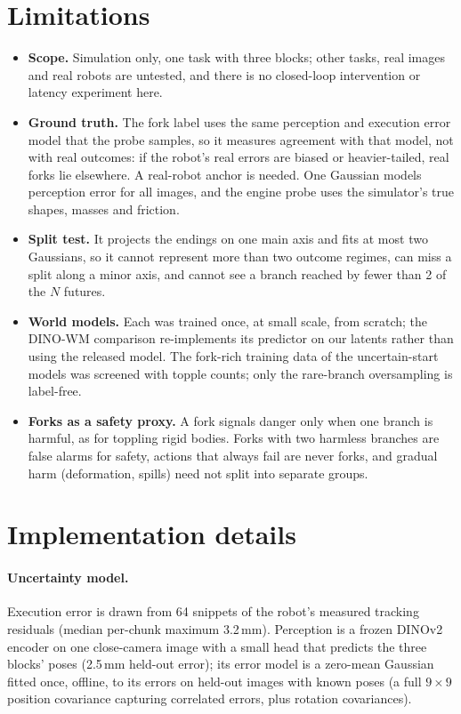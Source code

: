 \documentclass{article}
\begin{document}
\section{Limitations}\label{app:limitations}
\begin{itemize}\setlength{\itemsep}{1pt}\setlength{\parskip}{0pt}
\item \textbf{Scope.} Simulation only, one task with three blocks; other tasks, real images and real
robots are untested, and there is no closed-loop intervention or latency experiment here.
\item \textbf{Ground truth.} The fork label uses the same perception and execution error model that the
probe samples, so it measures agreement with that model, not with real outcomes: if the robot's real errors
are biased or heavier-tailed, real forks lie elsewhere. A real-robot anchor is needed. One Gaussian models perception error for all images, and the engine probe uses the simulator's
true shapes, masses and friction.
\item \textbf{Split test.} It projects the endings on one main axis and fits at most two Gaussians, so it
cannot represent more than two outcome regimes, can miss a split along a minor axis, and cannot see a branch
reached by fewer than 2 of the $N$ futures.
\item \textbf{World models.} Each was trained once, at small scale, from scratch; the DINO-WM comparison
re-implements its predictor on our latents rather than using the released model. The fork-rich training
data of the uncertain-start models was screened with topple counts; only the rare-branch oversampling is
label-free.
\item \textbf{Forks as a safety proxy.} A fork signals danger only when one branch is harmful, as for
toppling rigid bodies. Forks with two harmless branches are false alarms for safety, actions that always
fail are never forks, and gradual harm (deformation, spills) need not split into separate groups.
\end{itemize}

\section{Implementation details}\label{app:details}
\paragraph{Uncertainty model.} Execution error is drawn from 64 snippets of the robot's measured tracking
residuals (median per-chunk maximum 3.2\,mm). Perception is a frozen DINOv2 encoder on one close-camera
image with a small head that predicts the three blocks' poses (2.5\,mm held-out error); its error model
is a zero-mean Gaussian fitted once, offline, to its errors on held-out images with known poses (a full
$9\times9$ position covariance capturing correlated errors, plus rotation covariances).
\end{document}
